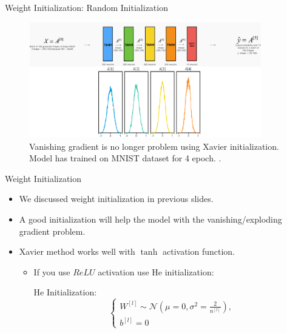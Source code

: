 \begin{frame}{Weight Initialization: Random Initialization}
	\begin{figure}[H]
		\centering
		\includegraphics[width=0.9\textwidth]{Images/xavier-init.png}
		\caption{Vanishing gradient is no longer problem using Xavier initialization. Model has trained on MNIST dataset for 4 epoch. \cite{katanforoosh-kunin}.}
	\end{figure}
\end{frame}

\begin{frame}{Weight Initialization}
	\begin{itemize}
		\item We discussed weight initialization in previous slides.
		\item A good initialization will help the model with the vanishing/exploding gradient problem.
		\item Xavier method works well with $\tanh$ activation function.
		\begin{itemize}
			\item If you use $ReLU$ activation use He initialization:
			\begin{block}{He Initialization:}
				\setlength{\textwidth}{0.4\textwidth}
				\[
				\begin{cases}
					W^{[l]} \sim \mathcal{N}\left(\mu=0, \sigma^2=\frac{2}{n^{[l]}}\right), \\
					b^{[l]} = 0
				\end{cases}
				\]
			\end{block}
		\end{itemize}
	\end{itemize}
\end{frame}

